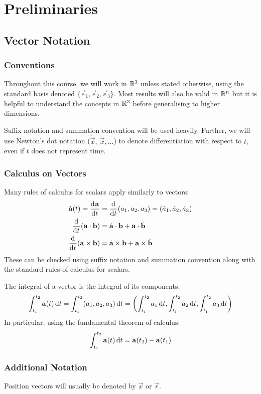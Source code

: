 \documentclass[../main.tex]{subfiles}
\begin{document}
\chapter{Preliminaries}
\section{Vector Notation}
\subsection{Conventions}
Throughout this course, we will work in $\mathbb{R}^3$ unless stated otherwise, using the standard basis denoted $\{\vec{e}_1, \vec{e}_2, \vec{e}_3\}$.
Most results will also be valid in $\mathbb{R}^{n}$ but it is helpful to understand the concepts in $\mathbb{R}^{3}$ before generalising to higher dimensions.

Suffix notation and summation convention will be used heavily.
Further, we will use Newton's dot notation ($\dot{\vec{x}},\ \ddot{\vec{x}}, \ldots$) to denote differentiation with respect to $t$, even if $t$ does not represent time.

\subsection{Calculus on Vectors}
Many rules of calculus for scalars apply similarly to vectors:
\begin{align*}
  \dot{\vec{a}}(t) = \deriv{\vec{a}}{t}& = \deriv{}{t}(a_1, a_2, a_3) = (\dot{a}_1, \dot{a}_2, \dot{a}_3) \\
  \deriv{}{t}(\vec{a} \cdot \vec{b}) &= \dot{\vec{a}} \cdot \vec{b} + \vec{a} \cdot \dot{\vec{b}} \\
  \deriv{}{t}(\vec{a} \times \vec{b}) &= \dot{\vec{a}} \times \vec{b} + \vec{a} \times \dot{\vec{b}}
\end{align*}
These can be checked using suffix notation and summation convention along with the standard rules of calculus for scalars.

The integral of a vector is the integral of its components:
\begin{equation}
  \int_{t_1}^{t_2} \vec{a}(t) \d{t} = \int_{t_1}^{t_2} (a_1, a_2, a_3) \d{t} = \left(\int_{t_1}^{t_2} a_1 \d{t}, \int_{t_1}^{t_2} a_2 \d{t}, \int_{t_1}^{t_2} a_3 \d{t}\right) \label{integralVector}
\end{equation}
In particular, using the fundamental theorem of calculus:
\[
  \int_{t_1}^{t_2} \dot{\vec{a}}(t) \d{t} = \vec{a}(t_2) - \vec{a}(t_1)
\]
\subsection{Additional Notation}
Position vectors will usually be denoted by $\vec{x}$ or $\vec{r}$.
\end{document}
